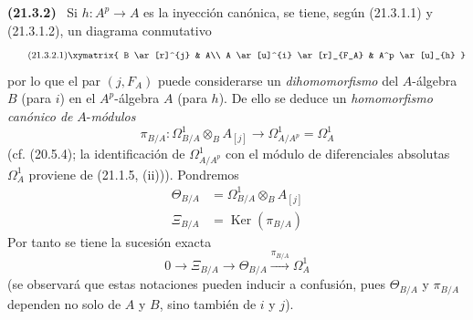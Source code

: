 \documentclass[10pt,oneside]{book}
\makeatletter
\newcommand{\setmanualcurrentlabel}[1]{\def\@currentlabel{#1}}
\newcommand{\oldpage}[2][]{%
  \setcounter{footnote}{0}%
  \marginpar{\scriptsize\textbf{#1}~|~#2}\ignorespaces}
\newenvironment{env}[1][]{\setmanualcurrentlabel{#1}\par\medskip\noindent\textbf{(#1)}\ }{\par}
\makeatother
\begin{document}
\begin{env}[21.3.2]
\label{0.21.3.2-es}
Si $h:A^p\to A$ es la inyección canónica, se tiene, según (21.3.1.1) y
(21.3.1.2), un diagrama conmutativo
\begin{equation}
\tag{21.3.2.1}\label{0.21.3.2.1-es}
\xymatrix{
 B \ar[r]^{j} & A\\
 A \ar[u]^{i} \ar[r]_{F_A} & A^p \ar[u]_{h}
}
\end{equation}
por lo que el par $(j,F_A)$ puede considerarse un \emph{dihomomorfismo} del
$A$-álgebra $B$ (para $i$) en el $A^p$-álgebra $A$ (para $h$).
De ello se deduce un \emph{homomorfismo canónico de} $A$-\emph{módulos}
\begin{equation}
\tag{21.3.2.2}\label{0.21.3.2.2-es}
\pi_{B/A}:\Omega^1_{B/A}\otimes_B A_{[j]}\longrightarrow
\Omega^1_{A/A^p}=\Omega^1_A
\end{equation}
(cf. (20.5.4); la identificación de $\Omega^1_{A/A^p}$ con el módulo de
diferenciales absolutas $\Omega^1_A$ proviene de (21.1.5, (ii))).
Pondremos
\begin{align}
\tag{21.3.2.3}\label{0.21.3.2.3-es}
\Theta_{B/A}&=\Omega^1_{B/A}\otimes_B A_{[j]}\\
\tag{21.3.2.4}\label{0.21.3.2.4-es}
\Xi_{B/A}&=\operatorname{Ker}(\pi_{B/A})
\end{align}
\oldpage[0\textsubscript{IV-1}]{161}
Por tanto se tiene la sucesión exacta
\begin{equation}
\tag{21.3.2.5}\label{0.21.3.2.5-es}
0\to\Xi_{B/A}\to\Theta_{B/A}\xrightarrow{\pi_{B/A}}\Omega^1_A
\end{equation}
(se observará que estas notaciones pueden inducir a confusión, pues
$\Theta_{B/A}$ y $\pi_{B/A}$ dependen no solo de $A$ y $B$, sino también de
$i$ y $j$).
\end{env}
\end{document}
